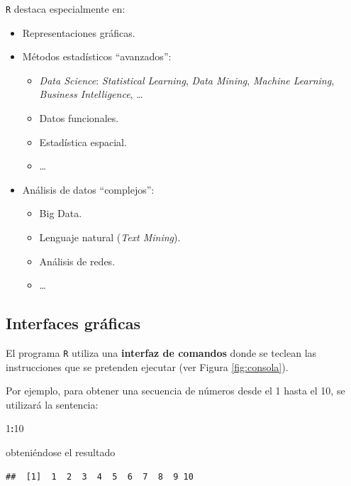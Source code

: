 \documentclass[]{book}
\newenvironment{Shaded}{\begin{snugshade}}{\end{snugshade}}
\newcommand{\DecValTok}[1]{\textcolor[rgb]{0.00,0.00,0.81}{#1}}
\newcommand{\OperatorTok}[1]{\textcolor[rgb]{0.81,0.36,0.00}{\textbf{#1}}}
\begin{document}
\texttt{R} destaca especialmente en:

\begin{itemize}
\item
  Representaciones gráficas.
\item
  Métodos estadísticos ``avanzados'':

  \begin{itemize}
  \item
    \emph{Data Science}: \emph{Statistical Learning}, \emph{Data
    Mining}, \emph{Machine Learning}, \emph{Business Intelligence},
    \ldots{}
  \item
    Datos funcionales.
  \item
    Estadística espacial.
  \item
    \ldots{}
  \end{itemize}
\item
  Análisis de datos ``complejos'':

  \begin{itemize}
  \item
    Big Data.
  \item
    Lenguaje natural (\emph{Text Mining}).
  \item
    Análisis de redes.
  \item
    \ldots{}
  \end{itemize}
\end{itemize}

\subsection{Interfaces gráficas}\label{interfaces-graficas}

El programa \texttt{R} utiliza una \textbf{interfaz de comandos} donde
se teclean las instrucciones que se pretenden ejecutar (ver Figura
\ref{fig:consola}).

Por ejemplo, para obtener una secuencia de números desde el 1 hasta el
10, se utilizará la sentencia:

\begin{Shaded}
\begin{Highlighting}[]
\DecValTok{1}\OperatorTok{:}\DecValTok{10}
\end{Highlighting}
\end{Shaded}

obteniéndose el resultado

\begin{verbatim}
##  [1]  1  2  3  4  5  6  7  8  9 10
\end{verbatim}
\end{document}
